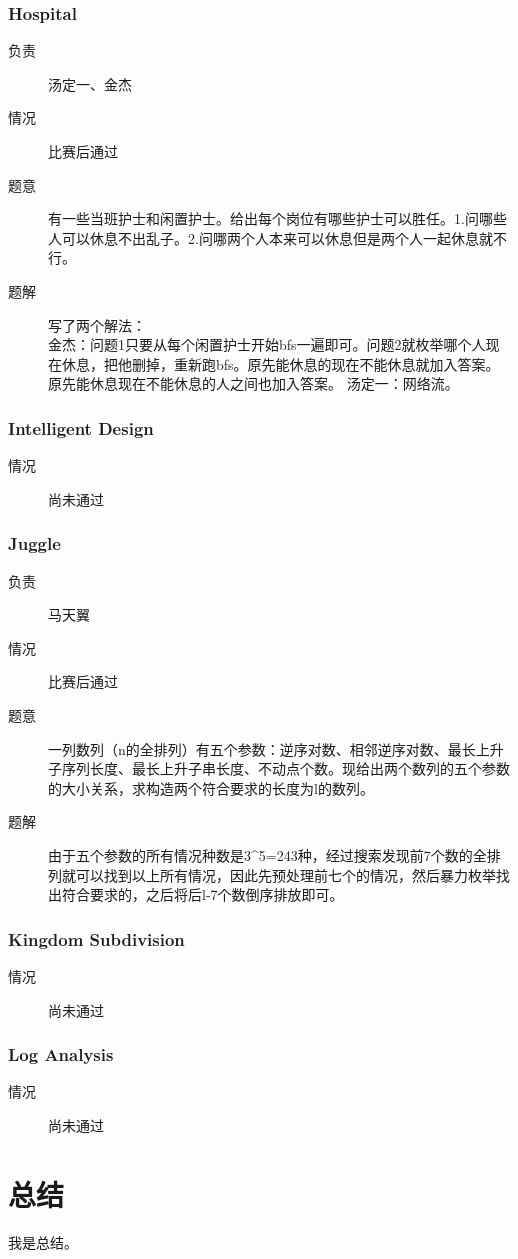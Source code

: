 \documentclass[a4paper, 11pt, nofonts, nocap, fancyhdr]{ctexart}
\newcommand{\problem}[1]{\subsubsection{#1}}
\begin{document}
\problem{Hospital}

\begin{description}
\item[负责] 汤定一、金杰
\item[情况] 比赛后通过
\item[题意]
有一些当班护士和闲置护士。给出每个岗位有哪些护士可以胜任。1.问哪些人可以休息不出乱子。2.问哪两个人本来可以休息但是两个人一起休息就不行。
\item[题解]
写了两个解法：\\
金杰：问题1只要从每个闲置护士开始bfs一遍即可。问题2就枚举哪个人现在休息，把他删掉，重新跑bfs。原先能休息的现在不能休息就加入答案。原先能休息现在不能休息的人之间也加入答案。
汤定一：网络流。
\end{description}

\problem{Intelligent Design}

\begin{description}
\item[情况] 尚未通过
\end{description}

\problem{Juggle}

\begin{description}
\item[负责] 马天翼
\item[情况] 比赛后通过
\item[题意]
一列数列（n的全排列）有五个参数：逆序对数、相邻逆序对数、最长上升子序列长度、最长上升子串长度、不动点个数。现给出两个数列的五个参数的大小关系，求构造两个符合要求的长度为l的数列。
\item[题解]
由于五个参数的所有情况种数是3^5=243种，经过搜索发现前7个数的全排列就可以找到以上所有情况，因此先预处理前七个的情况，然后暴力枚举找出符合要求的，之后将后l-7个数倒序排放即可。
\end{description}

\problem{Kingdom Subdivision}

\begin{description}
\item[情况] 尚未通过
\end{description}

\problem{Log Analysis}

\begin{description}
\item[情况] 尚未通过
\end{description}

\section{总结}

我是总结。
\end{document}
